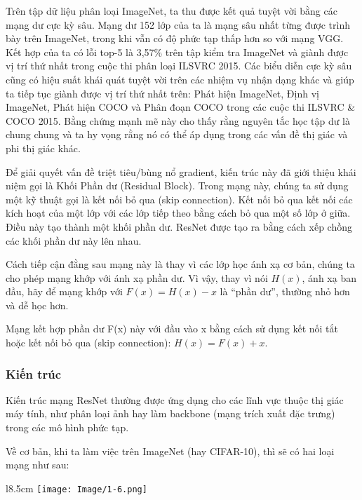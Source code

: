 \documentclass[../main.tex]{subfiles}
\begin{document}
Trên tập dữ liệu phân loại ImageNet, ta thu được kết quả tuyệt vời bằng các mạng dư cực kỳ sâu. Mạng dư 152 lớp của ta là mạng sâu nhất từng được trình bày trên ImageNet, trong khi vẫn có độ phức tạp thấp hơn so với mạng VGG. Kết hợp của ta có lỗi top-5 là 3,57\% trên tập kiểm tra ImageNet và giành được vị trí thứ nhất trong cuộc thi phân loại ILSVRC 2015. Các biểu diễn cực kỳ sâu cũng có hiệu suất khái quát tuyệt vời trên các nhiệm vụ nhận dạng khác và giúp ta tiếp tục giành được vị trí thứ nhất trên: Phát hiện ImageNet, Định vị ImageNet, Phát hiện COCO và Phân đoạn COCO trong các cuộc thi ILSVRC \& COCO 2015. Bằng chứng mạnh mẽ này cho thấy rằng nguyên tắc học tập dư là chung chung và ta hy vọng rằng nó có thể áp dụng trong các vấn đề thị giác và phi thị giác khác.

Để giải quyết vấn đề triệt tiêu/bùng nổ gradient, kiến trúc này đã giới thiệu khái niệm gọi là Khối Phần dư (Residual Block). Trong mạng này, chúng ta sử dụng một kỹ thuật gọi là kết nối bỏ qua (skip connection). Kết nối bỏ qua kết nối các kích hoạt của một lớp với các lớp tiếp theo bằng cách bỏ qua một số lớp ở giữa. Điều này tạo thành một khối phần dư. ResNet được tạo ra bằng cách xếp chồng các khối phần dư này lên nhau.

Cách tiếp cận đằng sau mạng này là thay vì các lớp học ánh xạ cơ bản, chúng ta cho phép mạng khớp với ánh xạ phần dư. Vì vậy, thay vì nói \(H(x)\), ánh xạ ban đầu, hãy để mạng khớp với \(F(x) = H(x) - x\) là ``phần dư'', thường nhỏ hơn và dễ học hơn.

Mạng kết hợp phần dư F(x) này với đầu vào x bằng cách sử dụng kết nối tắt hoặc kết nối bỏ qua (skip connection): \(H(x) = F(x) + x\).


\newpage

\subsubsection*{Kiến trúc}

Kiến trúc mạng ResNet thường được ứng dụng cho các lĩnh vực thuộc thị giác máy tính, như phân loại ảnh hay làm backbone (mạng trích xuất đặc trưng) trong các mô hình phức tạp.

Về cơ bản, khi ta làm việc trên ImageNet (hay CIFAR-10), thì sẽ có hai loại mạng như sau:

\begin{wrapfigure}{l}{8.5cm}
    \texttt{[image: Image/1-6.png]}
\end{wrapfigure}
\end{document}
